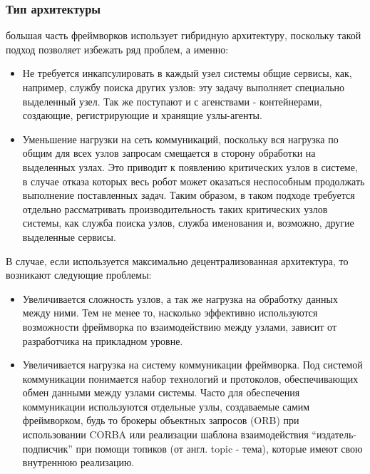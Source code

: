 \subsubsection{Тип архитектуры} большая часть фреймворков использует гибридную архитектуру, поскольку такой подход позволяет избежать ряд проблем, а именно:
\begin{itemize}
	\item Не требуется инкапсулировать в каждый узел системы общие сервисы, как, например, службу поиска других узлов: эту задачу выполняет специально выделенный узел. Так же поступают и с агенствами - контейнерами, создающие, регистрирующие и хранящие узлы-агенты.
	\item Уменьшение нагрузки на сеть коммуникаций, поскольку вся нагрузка по общим для всех узлов запросам смещается в сторону обработки на выделенных узлах. Это приводит к появлению критических узлов в системе, в случае отказа которых весь робот может оказаться неспособным продолжать выполнение поставленных задач. Таким образом, в таком подходе требуется отдельно рассматривать производительность таких критических узлов системы, как служба поиска узлов, служба именования и, возможно, другие выделенные сервисы.
\end{itemize}
В случае, если используется максимально децентрализованная архитектура, то возникают следующие проблемы:
\begin{itemize}
	\item Увеличивается сложность узлов, а так же нагрузка на обработку данных между ними. Тем не менее то, насколько эффективно используются возможности фреймворка по взаимодействию между узлами, зависит от разработчика на прикладном уровне.
	\item Увеличивается нагрузка на систему коммуникации фреймворка. Под системой коммуникации понимается набор технологий и протоколов, обеспечивающих обмен данными между узлами системы. Часто для обеспечения коммуникации используются отдельные узлы, создаваемые самим фреймворком, будь то брокеры объектных запросов (ORB) при использовании CORBA или реализации шаблона взаимодействия \enquote{издатель-подписчик} при помощи топиков (от англ. topic - тема), которые имеют свою внутреннюю реализацию.
\end{itemize}

